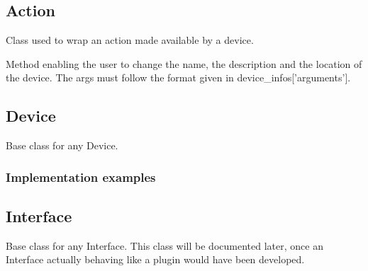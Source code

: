 \documentclass[letterpaper,10pt,english]{sphinxmanual}
\begin{document}
\subsection{Action}
\label{api/models:action}

\begin{fulllineitems}
\label{api/models:models.Action}
Class used to wrap an action made available by a device.

\begin{fulllineitems}
\label{api/models:models.Action.set}
Method enabling the user to change the name, the description and
the location of the device. The args must follow the format given in
device\_infos{[}'arguments'{]}.

\end{fulllineitems}


\end{fulllineitems}



\subsection{Device}
\label{api/models:device}

\begin{fulllineitems}
\label{api/models:models.Device}
Base class for any Device.

\end{fulllineitems}



\subsubsection{Implementation examples}
\label{api/models:implementation-examples}

\subsection{Interface}
\label{api/models:interface}

\begin{fulllineitems}
\label{api/models:models.Interface}
Base class for any Interface. This class will be documented
later, once an Interface actually behaving like a plugin would
have been developed.

\end{fulllineitems}
\end{document}
